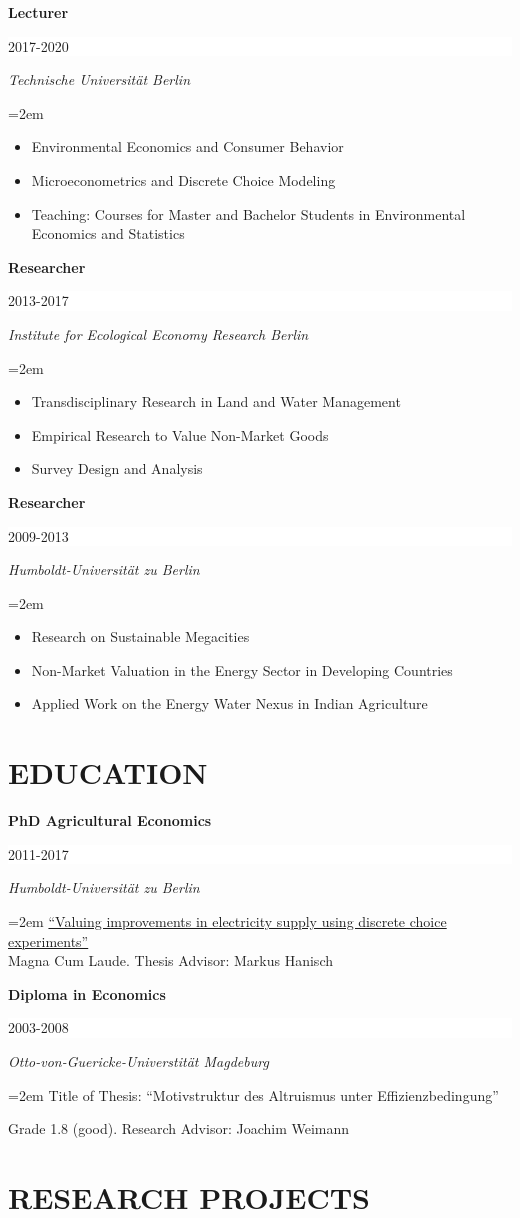\documentclass[paper=a4,fontsize=11pt]{scrartcl} %
\newcommand{\sepspace}{\vspace*{1em}}		%
\newcommand{\NewPart}[2]{\section*{\uppercase{#1} #2}}
\newcommand{\EducationEntry}[4]{
		\noindent \textbf{#1} \hfill      %
		\colorbox{White}{%
			\parbox{6em}{%
			\hfill\color{Black}#2}} \par  %
		\noindent \textit{#3} \par        %
		\noindent\hangindent=2em\hangafter=0 \small #4 %
		\normalsize \par}
\begin{document}
\EducationEntry{Lecturer}{2017-2020}{Technische Universität Berlin}
{\begin{itemize}
\item{Environmental Economics and Consumer Behavior}
\item{Microeconometrics and Discrete Choice Modeling}
\item{Teaching: Courses for Master and Bachelor Students in Environmental Economics and Statistics}
\end{itemize}}
\sepspace

\EducationEntry{Researcher}{2013-2017}{Institute for Ecological Economy Research Berlin}{\begin{itemize}\item{Transdisciplinary Research in Land and Water Management} \item{Empirical Research to Value Non-Market Goods} \item{Survey Design and Analysis}\end{itemize}}
\sepspace
\EducationEntry{Researcher}{2009-2013}{Humboldt-Universität zu Berlin}
{\begin{itemize}\item{Research on Sustainable Megacities} \item {Non-Market Valuation in the Energy Sector in Developing Countries} \item{Applied Work on the Energy Water Nexus in Indian Agriculture}\end{itemize}}


\sepspace
\NewPart{Education}{}

\EducationEntry{PhD Agricultural Economics}{2011-2017}{Humboldt-Universität zu Berlin}{\href{https://edoc.hu-berlin.de/handle/18452/18406?locale-attribute=en}{``Valuing improvements in electricity supply using discrete choice experiments''}\\
Magna Cum Laude. Thesis Advisor: Markus Hanisch}
\sepspace

\EducationEntry{Diploma in Economics}{2003-2008}{Otto-von-Guericke-Universtität Magdeburg}{Title of Thesis: ``Motivstruktur des Altruismus unter Effizienzbedingung''}{Grade 1.8 (good). Research Advisor: Joachim Weimann}





\NewPart{Research Projects}{}
\end{document}
